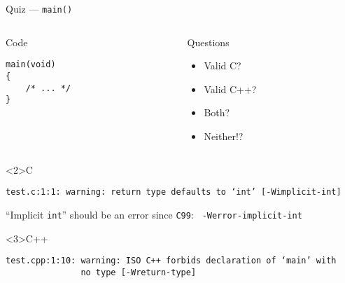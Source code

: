 \documentclass[presentation,aspectratio=169]{beamer}
\begin{document}
\begin{frame}[fragile,label={sec:orgb26de58}]{Quiz — \texttt{main()}}
 \begin{columns}
\begin{column}{0.48\columnwidth}
\begin{block}{Code}
\begin{verbatim}
main(void)
{
    /* ... */
}
\end{verbatim}
\end{block}
\end{column}

\begin{column}{0.48\columnwidth}
\begin{block}{Questions}
\begin{itemize}
\item Valid C?
\item Valid C++?
\item Both?
\item Neither!?
\end{itemize}
\end{block}
\end{column}
\end{columns}

\begin{block}<2>{C}
\begin{verbatim}
test.c:1:1: warning: return type defaults to ‘int’ [-Wimplicit-int]
\end{verbatim}
``Implicit \texttt{int}'' should be an error since \texttt{C99}: \texttt{ -Werror-implicit-int}
\end{block}

\vspace{-2cm}

\begin{block}<3>{C++}
\begin{verbatim}
test.cpp:1:10: warning: ISO C++ forbids declaration of ‘main’ with
               no type [-Wreturn-type]
\end{verbatim}
\end{block}
\end{frame}

\end{document}
